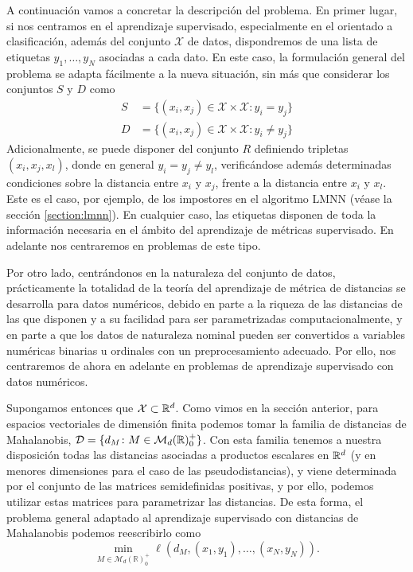     A continuación vamos a concretar la descripción del problema. En primer lugar, si nos centramos en el aprendizaje supervisado, especialmente en el orientado a clasificación, además del conjunto $\mathcal{X}$ de datos, dispondremos de una lista de etiquetas $y_1,\dots,y_N$ asociadas a cada dato. En este caso, la formulación general del problema se adapta fácilmente a la nueva situación, sin más que considerar los conjuntos $S$ y $D$ como
    \begin{align*}
        S &= \{(x_i,x_j) \in \mathcal{X}\times\mathcal{X} \colon y_i = y_j\} \\
        D &= \{(x_i,x_j) \in \mathcal{X}\times\mathcal{X} \colon y_i \ne y_j\} 
    \end{align*}
    Adicionalmente, se puede disponer del conjunto $R$ definiendo tripletas $(x_i,x_j,x_l)$, donde en general $y_i = y_j \ne y_l$, verificándose además determinadas condiciones sobre la distancia entre $x_i$ y $x_j$, frente a la distancia entre $x_i$ y $x_l$. Este es el caso, por ejemplo, de los impostores en el algoritmo LMNN (véase la sección \ref{section:lmnn}). En cualquier caso, las etiquetas disponen de toda la información necesaria en el ámbito del aprendizaje de métricas supervisado. En adelante nos centraremos en problemas de este tipo.

    Por otro lado, centrándonos en la naturaleza del conjunto de datos, prácticamente la totalidad de la teoría del aprendizaje de métrica de distancias se desarrolla para datos numéricos, debido en parte a la riqueza de las distancias de las que disponen y a su facilidad para ser parametrizadas computacionalmente, y en parte a que los datos de naturaleza nominal pueden ser convertidos a variables numéricas binarias u ordinales con un preprocesamiento adecuado. Por ello, nos centraremos de ahora en adelante en problemas de aprendizaje supervisado con datos numéricos.

    Supongamos entonces que $\mathcal{X} \subset \mathbb{R}^d$. Como vimos en la sección anterior, para espacios vectoriales de dimensión finita podemos tomar la familia de distancias de Mahalanobis, $\mathcal{D} = \{d_M \colon M \in \mathcal{M}_d(\mathbb{R})^+_0\}$. Con esta familia tenemos a nuestra disposición todas las distancias asociadas a productos escalares en $\mathbb{R}^d$ (y en menores dimensiones para el caso de las pseudodistancias), y viene determinada por el conjunto de las matrices semidefinidas positivas, y por ello, podemos utilizar estas matrices para parametrizar las distancias. De esta forma, el problema general adaptado al aprendizaje supervisado con distancias de Mahalanobis podemos reescribirlo como
    \begin{equation} \label{eq:metric_learning_eq}
        \min_{M \in \mathcal{M}_{d}(\mathbb{R})^+_0} \ell(d_M,(x_1,y_1),\dots,(x_N,y_N)) .
    \end{equation}


